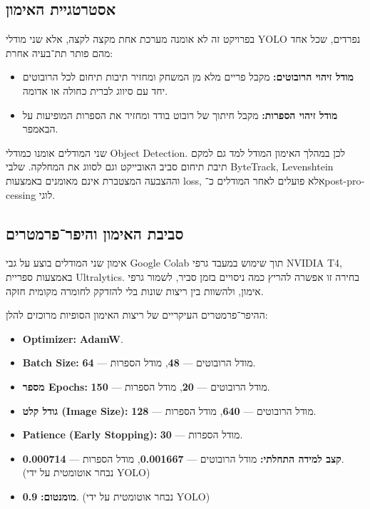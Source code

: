 \subsection{אסטרטגיית האימון}

בפרויקט זה לא אומנה מערכת אחת מקצה לקצה, אלא שני מודלי
\textenglish{YOLO} נפרדים, שכל אחד מהם פותר תת־בעיה אחרת:

\begin{itemize}
\item \textbf{מודל זיהוי הרובוטים:} מקבל פריים מלא מן המשחק ומחזיר
  תיבות תיחום לכל הרובוטים יחד עם סיווג לברית כחולה או אדומה.
\item \textbf{מודל זיהוי הספרות:} מקבל חיתוך של רובוט בודד ומחזיר את
  הספרות המופיעות על הבאמפר.
\end{itemize}

שני המודלים אומנו כמודלי \textenglish{Object Detection}. לכן במהלך
האימון המודל למד גם למקם תיבת תיחום סביב האובייקט וגם לסווג את
המחלקה. שלבי \textenglish{ByteTrack}, \textenglish{Levenshtein}
וההצבעה המצטברת אינם מאומנים באמצעות \textenglish{loss}, אלא פועלים
לאחר המודלים כ־\textenglish{post-processing} לוגי.

\subsection{סביבת האימון והיפר־פרמטרים}

אימון שני המודלים בוצע על גבי \textenglish{Google Colab} תוך שימוש
במעבד גרפי \textenglish{NVIDIA T4}, באמצעות ספריית
\textenglish{Ultralytics}. בחירה זו אפשרה להריץ כמה ניסויים בזמן סביר,
לשמור גרפי אימון, ולהשוות בין ריצות שונות בלי להזדקק לחומרה מקומית
חזקה.

ההיפר־פרמטרים העיקריים של ריצות האימון הסופיות מרוכזים להלן:

\begin{itemize}
\item \textbf{\textenglish{Optimizer}:} \textbf{AdamW}.
\item \textbf{\textenglish{Batch Size}:} מודל הרובוטים ---
  \textbf{48}, מודל הספרות --- \textbf{64}.
\item \textbf{מספר \textenglish{Epochs}:} מודל הרובוטים ---
  \textbf{20}, מודל הספרות --- \textbf{150}.
\item \textbf{גודל קלט (\textenglish{Image Size}):} מודל הרובוטים ---
  \textbf{640}, מודל הספרות --- \textbf{128}.
\item \textbf{\textenglish{Patience (Early Stopping)}:} מודל הספרות --- \textbf{30}.
\item \textbf{קצב למידה התחלתי:} מודל הרובוטים --- \textbf{0.001667},
  מודל הספרות --- \textbf{0.000714}. (נבחר אוטומטית על ידי
  \textenglish{YOLO})
\item \textbf{\textenglish{מומנטום}:} \textbf{0.9}. (נבחר אוטומטית על ידי
  \textenglish{YOLO})
\end{itemize}


